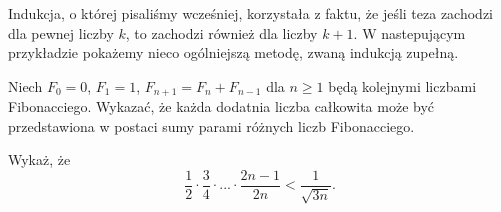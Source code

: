 


\noindent
Indukcja, o której pisaliśmy wcześniej, korzystała z faktu, że jeśli teza zachodzi dla pewnej liczby $k$, to zachodzi również dla liczby $k + 1$. W nastepującym przykładzie pokażemy nieco ogólniejszą metodę, zwaną indukcją zupełną.

\vspace{10px}


\noindent
Niech $F_0 = 0$, $F_1 = 1$, $F_{n + 1} = F_n + F_{n - 1}$ dla $n \geqslant 1$ będą kolejnymi liczbami Fibonacciego. Wykazać, że każda dodatnia liczba całkowita może być przedstawiona w postaci sumy parami różnych liczb Fibonacciego.

\vspace{10px}



\vspace{10px}


\noindent
Wykaż, że
\[
	\frac{1}{2} \cdot \frac{3}{4} \cdot ... \cdot \frac{2n - 1}{2n} < \frac{1}{\sqrt{3n}}.
\]